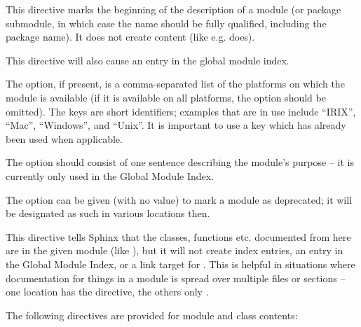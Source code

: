 \documentclass[letterpaper,10pt,english]{sphinxmanual}
\begin{document}
\begin{fulllineitems}
\label{domains:directive-py:module}
This directive marks the beginning of the description of a module (or package
submodule, in which case the name should be fully qualified, including the
package name).  It does not create content (like e.g. {\hyperref[domains:directive\string-py:class]{}} does).

This directive will also cause an entry in the global module index.

The  option, if present, is a comma-separated list of the
platforms on which the module is available (if it is available on all
platforms, the option should be omitted).  The keys are short identifiers;
examples that are in use include ``IRIX'', ``Mac'', ``Windows'', and ``Unix''.  It is
important to use a key which has already been used when applicable.

The  option should consist of one sentence describing the
module's purpose -- it is currently only used in the Global Module Index.

The  option can be given (with no value) to mark a module as
deprecated; it will be designated as such in various locations then.

\end{fulllineitems}


\begin{fulllineitems}
\label{domains:directive-py:currentmodule}
This directive tells Sphinx that the classes, functions etc. documented from
here are in the given module (like {\hyperref[domains:directive\string-py:module]{}}), but it will not
create index entries, an entry in the Global Module Index, or a link target
for {\hyperref[domains:role\string-py:mod]{}}.  This is helpful in situations where documentation
for things in a module is spread over multiple files or sections -- one
location has the {\hyperref[domains:directive\string-py:module]{}} directive, the others only
{\hyperref[domains:directive\string-py:currentmodule]{}}.

\end{fulllineitems}


The following directives are provided for module and class contents:
\end{document}
